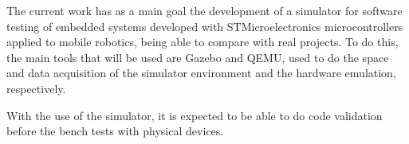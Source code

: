\documentclass[../../monografia.tex]{subfiles}
\begin{document}
The current work has as a main goal the development of a simulator for software testing of embedded systems developed with STMicroelectronics microcontrollers applied to mobile robotics, being able to compare with real projects. To do this, the main tools that will be used are Gazebo and QEMU, used to do the space and data acquisition of the simulator environment and the hardware emulation, respectively.

With the use of the simulator, it is expected to be able to do code validation before the bench tests with physical devices.
\end{document}
